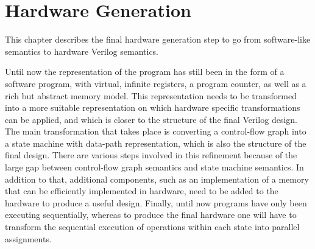 \chapter{Hardware Generation}%
\label{sec:hardware-generation}

\begin{chapsummary}
  This chapter describes the final hardware generation step to go from
  software-like semantics to hardware Verilog semantics.
\end{chapsummary}

\noindent Until now the representation of the program has still been in the form
of a software program, with virtual, infinite registers, a program counter, as
well as a rich but abstract memory model.  This representation needs to be
transformed into a more suitable representation on which hardware specific
transformations can be applied, and which is closer to the structure of the
final Verilog design.  The main transformation that takes place is converting a
control-flow graph into a state machine with data-path representation, which is
also the structure of the final design.  There are various steps involved in
this refinement because of the large gap between control-flow graph semantics
and state machine semantics.  In addition to that, additional components, such
as an implementation of a memory that can be efficiently implemented in
hardware, need to be added to the hardware to produce a useful design.  Finally,
until now programs have only been executing sequentially, whereas to produce the
final hardware one will have to transform the sequential execution of operations
within each state into parallel assignments.

